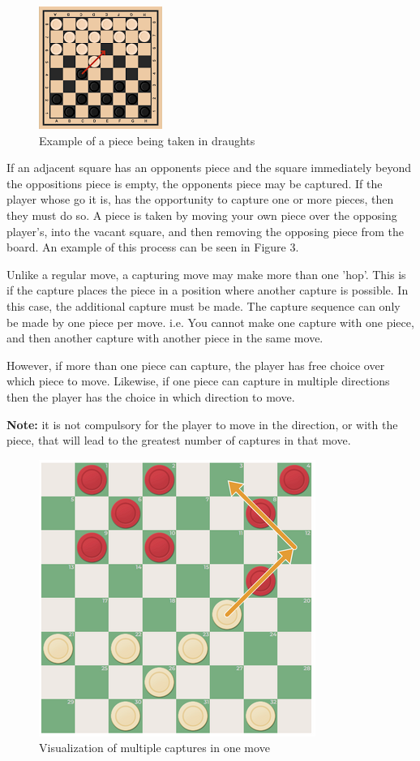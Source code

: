 \documentclass{article}
\begin{document}
    \begin{figure}
        \centering
        \includegraphics[scale=1.15]{piece being taken.png}
        \caption{Example of a piece being taken in draughts}
    \end{figure}
    If an adjacent square has an opponents piece and the square immediately beyond the oppositions piece is empty, the opponents piece may be captured.
    If the player whose go it is, has the opportunity to capture one or more pieces, then they must do so. 
    A piece is taken by moving your own piece over the opposing player's, into the vacant square, and then removing the opposing piece from the board.
    An example of this process can be seen in Figure 3.

    Unlike a regular move, a capturing move may make more than one 'hop'. This is if the capture places the piece in a position where another capture is possible.
    In this case, the additional capture must be made. The capture sequence can only be made by one piece per move. i.e. You cannot make one capture with one piece, 
    and then another capture with another piece in the same move.
    
    However, if more than one piece can capture, the player has free choice over which piece to move. Likewise, if one piece can capture in multiple
    directions then the player has the choice in which direction to move. 
    
    
    \textbf{Note:} it is not compulsory for the player to move in the direction, or with the piece,
    that will lead to the greatest number of captures in that move.
    
    \begin{figure}[h]
        \centering
        \includegraphics[scale=0.6]{double hop.png}
        \caption{Visualization of multiple captures in one move}
    \end{figure}
\end{document}
